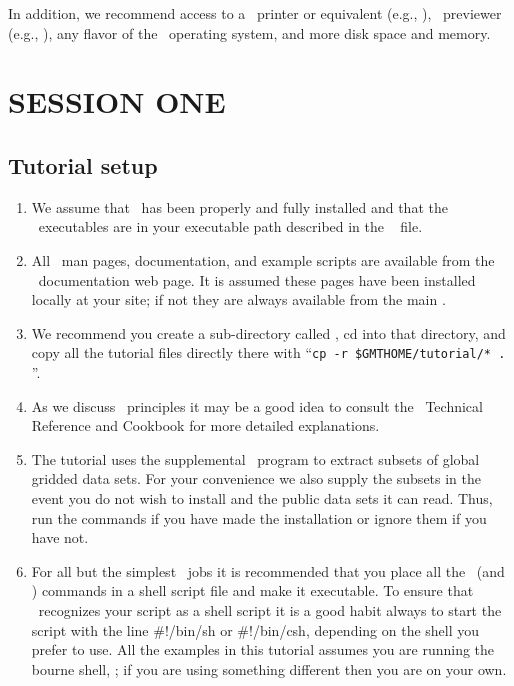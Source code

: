 \documentclass{report}
\begin{document}
In addition, we recommend access to a \PS\ printer or equivalent
(e.g., ), \PS\ previewer (e.g., ),
any flavor of the \UNIX\ operating system, and more disk space and memory.

\chapter{SESSION ONE} 
\thispagestyle{headings}

\section{Tutorial setup}
\begin{enumerate}

\item We assume that \GMT\ has been properly and fully
installed and that the \GMT\ executables are in your executable path
described in the \GMT\  file.

\item All \GMT\ man pages, documentation, and example scripts
are available from the \GMT\ documentation web page.  It is
assumed these pages have been installed locally at your site;
if not they are always available from the main
.

\item We recommend you create a sub-directory called ,
cd into that directory, and copy all the tutorial files directly
there with ``\texttt{cp -r \$GMTHOME/tutorial/* .} ''.

\item As we discuss \GMT\ principles it may be a good idea to
consult the \GMT\ Technical Reference and Cookbook for more
detailed explanations.

\item The tutorial uses the supplemental \GMT\ program
 to extract subsets of global gridded data
sets.  For your convenience we also supply the subsets in the
event you do not wish to install  and the
public data sets it can read.  Thus, run the 
commands if you have made the installation or ignore them if
you have not.

\item For all but the simplest \GMT\ jobs it is recommended that
you place all the \GMT\ (and \UNIX) commands in a shell script
file and make it executable.  To ensure that \UNIX\ recognizes
your script as a shell script it is a good habit always to start
the script with the line \#!/bin/sh or \#!/bin/csh, depending on the shell you prefer to use.
All the examples in this tutorial assumes you are running the bourne shell, ; if you are using
something different then you are on your own.


\end{enumerate}
\end{document}
